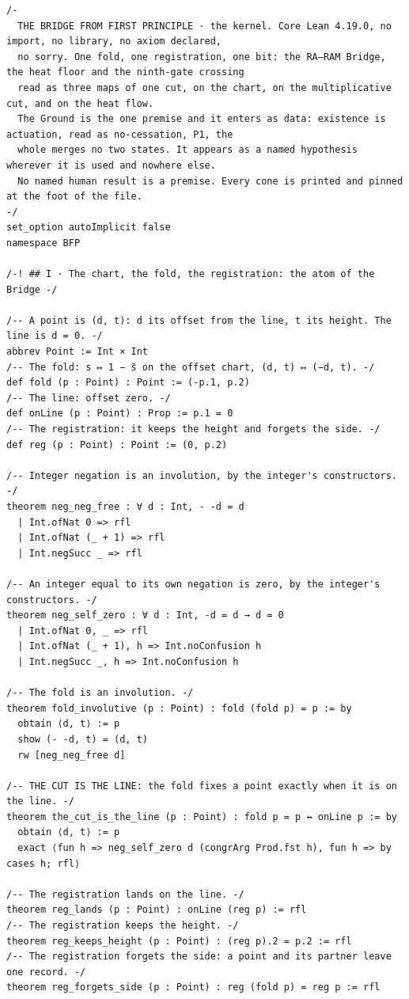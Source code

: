 \documentclass[10pt,twocolumn]{article}
\begin{document}
\begin{Verbatim}
/-
  THE BRIDGE FROM FIRST PRINCIPLE · the kernel. Core Lean 4.19.0, no import, no library, no axiom declared,
  no sorry. One fold, one registration, one bit: the RA–RAM Bridge, the heat floor and the ninth-gate crossing
  read as three maps of one cut, on the chart, on the multiplicative cut, and on the heat flow.
  The Ground is the one premise and it enters as data: existence is actuation, read as no-cessation, P1, the
  whole merges no two states. It appears as a named hypothesis wherever it is used and nowhere else.
  No named human result is a premise. Every cone is printed and pinned at the foot of the file.
-/
set_option autoImplicit false
namespace BFP

/-! ## I · The chart, the fold, the registration: the atom of the Bridge -/

/-- A point is (d, t): d its offset from the line, t its height. The line is d = 0. -/
abbrev Point := Int × Int
/-- The fold: s ↦ 1 − s̄ on the offset chart, (d, t) ↦ (−d, t). -/
def fold (p : Point) : Point := (-p.1, p.2)
/-- The line: offset zero. -/
def onLine (p : Point) : Prop := p.1 = 0
/-- The registration: it keeps the height and forgets the side. -/
def reg (p : Point) : Point := (0, p.2)

/-- Integer negation is an involution, by the integer's constructors. -/
theorem neg_neg_free : ∀ d : Int, - -d = d
  | Int.ofNat 0 => rfl
  | Int.ofNat (_ + 1) => rfl
  | Int.negSucc _ => rfl

/-- An integer equal to its own negation is zero, by the integer's constructors. -/
theorem neg_self_zero : ∀ d : Int, -d = d → d = 0
  | Int.ofNat 0, _ => rfl
  | Int.ofNat (_ + 1), h => Int.noConfusion h
  | Int.negSucc _, h => Int.noConfusion h

/-- The fold is an involution. -/
theorem fold_involutive (p : Point) : fold (fold p) = p := by
  obtain ⟨d, t⟩ := p
  show (- -d, t) = (d, t)
  rw [neg_neg_free d]

/-- THE CUT IS THE LINE: the fold fixes a point exactly when it is on the line. -/
theorem the_cut_is_the_line (p : Point) : fold p = p ↔ onLine p := by
  obtain ⟨d, t⟩ := p
  exact ⟨fun h => neg_self_zero d (congrArg Prod.fst h), fun h => by cases h; rfl⟩

/-- The registration lands on the line. -/
theorem reg_lands (p : Point) : onLine (reg p) := rfl
/-- The registration keeps the height. -/
theorem reg_keeps_height (p : Point) : (reg p).2 = p.2 := rfl
/-- The registration forgets the side: a point and its partner leave one record. -/
theorem reg_forgets_side (p : Point) : reg (fold p) = reg p := rfl


\end{Verbatim}
\end{document}
